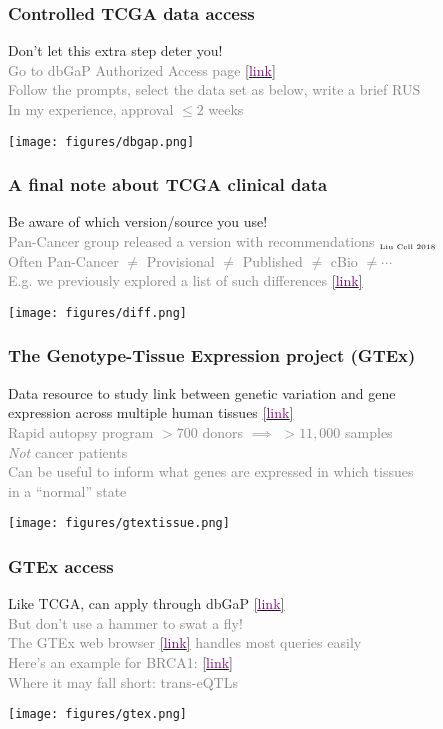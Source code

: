 \documentclass{beamer}
\newcommand{\si}[1]{\hspace{.5cm} \textcolor{gray} {#1}\\}
\newcommand{\sicont}[1]{\hspace{1cm} \textcolor{gray} {#1}\\}
\newcommand{\cref}[1]{\href{#1}{[\textcolor{purple}{link}]}}
\begin{document}
{\begin{frame}[t]
\frametitle{Controlled TCGA data access}
Don't let this extra step deter you!\\
\si{Go to dbGaP Authorized Access page \cref{https://dbgap.ncbi.nlm.nih.gov/aa/wga.cgi?page=login}}
\si{Follow the prompts, select the data set as below, write a brief RUS}
\si{In my experience, approval $\le 2$ weeks}
\begin{center}
\texttt{[image: figures/dbgap.png]}
\end{center}
\end{frame}

\begin{frame}[t]
\frametitle{A final note about TCGA clinical data}
Be aware of which version/source you use!\\
\si{Pan-Cancer group released a version with recommendations $_{\text{\tiny{Liu Cell 2018}}}$}
\si{Often Pan-Cancer $\ne$ Provisional $\ne$ Published  $\ne$ cBio $\ne\cdots$}
\si{E.g. we previously explored a list of such differences \cref{https://github.com/GerkeLab/TCGAclinical}}
\begin{center}
\texttt{[image: figures/diff.png]}
\end{center}
\end{frame}

\begin{frame}[t]
\frametitle{The Genotype-Tissue Expression project (GTEx)}
Data resource to study link between genetic variation and gene\\
\hspace{.5cm} expression across multiple human tissues \cref{https://www.gtexportal.org/home/}\\
\si{Rapid autopsy program $>700$ donors $\implies$ $>11,000$ samples}
\si{\emph{Not} cancer patients}
\si{Can be useful to inform what genes are expressed in which tissues}
\sicont{in a ``normal'' state}
\vspace{.2cm}
\begin{center}
\texttt{[image: figures/gtextissue.png]}
\end{center}
\end{frame}

\begin{frame}[t]
\frametitle{GTEx access}
Like TCGA, can apply through dbGaP \cref{https://gtexportal.org/home/datasets}\\
\si{But don't use a hammer to swat a fly!}
\si{The GTEx web browser \cref{https://gtexportal.org/home/} handles most queries easily}
\si{Here's an example for BRCA1: \cref{https://gtexportal.org/home/gene/BRCA1}}
\si{Where it may fall short: trans-eQTLs}
\begin{center}
\texttt{[image: figures/gtex.png]}
\end{center}
\end{frame}

}
\end{document}
